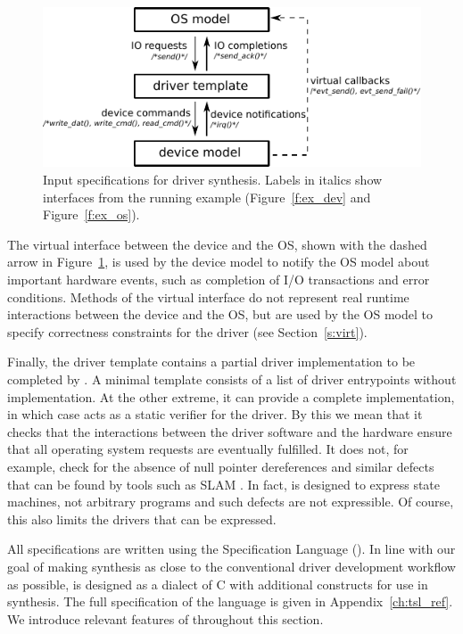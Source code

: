 \begin{figure}
    \center
    \includegraphics[width=0.85\linewidth]{imgs/actions.pdf}
    \caption{Input specifications for driver synthesis.  
    Labels in italics show interfaces from the running example
(Figure~\ref{f:ex_dev} and Figure~\ref{f:ex_os}).}\label{f:actions}
\end{figure}

The virtual interface between the device and the OS, shown with the dashed arrow in Figure~\ref{f:actions}, is used by the device model to notify the OS model about important hardware events, such as completion of I/O transactions and error conditions.  Methods of the virtual interface do not represent real runtime interactions between the device and the OS, but are used by the OS model to specify correctness constraints for the driver (see Section~\ref{s:virt}).

Finally, the driver template contains a partial driver implementation to be completed by \termite.  A minimal template consists of a list of driver entrypoints without implementation.  At the other extreme, it can provide a complete implementation, in which case \termite acts as a static verifier for the driver. By this we mean that it checks that the interactions between the driver software and the hardware ensure that all operating system requests are eventually fulfilled. It does not, for example, check for the absence of null pointer dereferences and similar defects that can be found by tools such as SLAM \cite{Ball_BKL_10}. In fact, \tsl is designed to express state machines, not arbitrary programs and such defects are not expressible. Of course, this also limits the drivers that can be expressed.

All specifications are written using the \termite Specification Language (\tsl).  In line with our goal of making synthesis as close to the conventional driver development workflow as possible, \tsl is designed as a dialect of C with additional constructs for use in synthesis.  The full specification of the \tsl language is given in Appendix~\ref{ch:tsl_ref}. We introduce relevant features of \tsl throughout this section.

